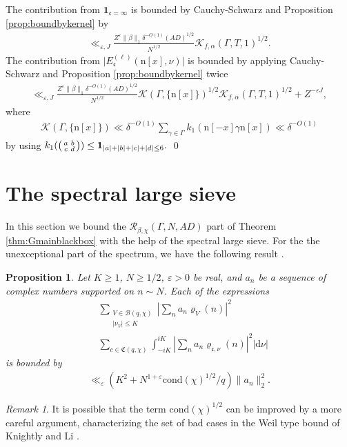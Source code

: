 \documentclass[12pt]{amsart}
\newtheorem{proposition}[theorem]{Proposition}
\theoremstyle{definition}
\theoremstyle{remark}
\newtheorem{remark}{Remark}
\numberwithin{equation}{section}
\newcommand{\B}{\mathcal{B}}
\newcommand{\1}{{\mathbf 1}}
\newcommand{\eps}{\varepsilon}
\newcommand{\n}{\mathrm{n}}
\renewcommand{\d}{\mathrm d}
\renewcommand{\n}{\mathrm{n}}
\begin{document}
The contribution from $\mathbf{1}_{\mathfrak{c} = \infty}$ is bounded by Cauchy-Schwarz and Proposition \ref{prop:boundbykernel} by
\begin{align*}
    \ll_{\eps,J}  \frac{Z^\eps \|\beta\|_1 \delta^{-O(1)}(AD)^{1/2}}{N^{1/2}} \mathcal{K}_{f,\alpha}(\Gamma,T,1)^{1/2}.
\end{align*} 
The contribution from $\bigg|E^{(\ell)}_{\mathfrak{c}}(\n[x],\nu)\bigg|$ is bounded by applying Cauchy-Schwarz and Proposition \ref{prop:boundbykernel} twice 
\begin{align*}
  \ll_{\eps,J}  \frac{Z^\eps \|\beta\|_1 \delta^{-O(1)}(AD)^{1/2}}{N^{1/2}} \mathcal{K}(\Gamma,\{\n[x]\})^{1/2}\mathcal{K}_{f,\alpha}(\Gamma,T,1)^{1/2}  + Z^{-\eps J},
\end{align*}
where
\begin{align*}
\mathcal{K}(\Gamma,\{\n[x]\})  \ll  \delta^{-O(1)} \sum_{\gamma \in \Gamma} k_1(\n[-x] \gamma \n[x]) \ll \delta^{-O(1)}
\end{align*}
by using $k_1(\smqty(a& b \\ c& d)) \leq \mathbf{1}_{|a|+|b|  +|c|+|d| \leq 6}.$  \qed
\section{The spectral large sieve}\label{sec:spectrallarge}
In this section we bound the $\mathcal{R}_{\beta,\chi}(\Gamma,N,AD)$ part of Theorem \ref{thm:Gmainblackbox} with the help of the spectral large sieve. For the the unexceptional part of the spectrum, we have the following result \cite[Proposition 4.7]{Drappeau}.
\begin{proposition}\label{prop:speclasie}
    Let $K\ge 1$, $N\ge 1/2$, $\eps>0$ be real, and $a_n$ be a sequence of complex numbers supported on $n\sim N$. Each of the expressions
    \begin{align}
    &\sum_{\substack{ V \in \B(q,\chi) \\|\nu_V|\leq K}} \left|\sum_n a_n \varrho_V(n) \right|^2\\
       & \sum_{c\in \mathfrak{C}(q,\chi)} \int_{-iK}^{iK} \left|\sum_n a_n \varrho_{\mathfrak{c},\nu}(n) \right|^2 |\d \nu|
    \end{align}
    is bounded by
    \begin{align*}
        \ll_\eps (K^2+N^{1+\eps}\mathrm{cond}(\chi)^{1/2}/q) \|  a_n \|_2^2.
    \end{align*}
\end{proposition} 

\begin{remark}\label{rem:improvedchidependcy}
    It is possible that the term $\mathrm{cond}(\chi)^{1/2}$ can be improved by a more careful argument, characterizing the set of bad cases in the Weil type bound of Knightly and Li \cite[Theorem 9.3]{knightlyli}.
\end{remark}
\end{document}
